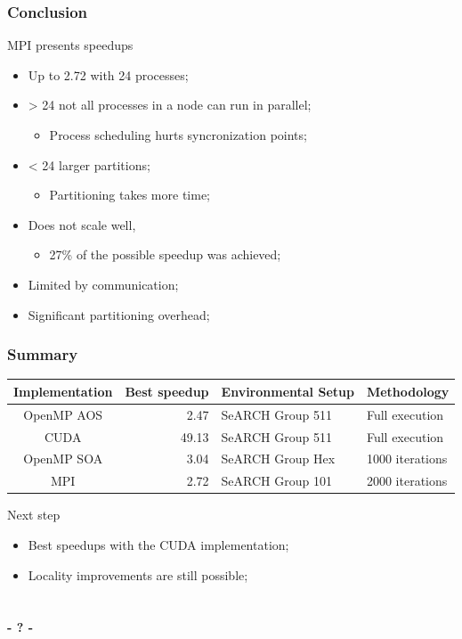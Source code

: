 \documentclass{beamer}
\begin{document}
\begin{frame}
	\frametitle{Conclusion}
	\begin{block}{MPI presents speedups}
		\begin{itemize}
			\item{Up to 2.72 with 24 processes;}
			\item{> 24 not all processes in a node can run in parallel;
			\begin{itemize}
				\item{Process scheduling hurts syncronization points;}
			\end{itemize}
			}
			\item{< 24 larger partitions;
			\begin{itemize}
				\item{Partitioning takes more time;}
			\end{itemize}
			}
			\item{Does not scale well,
			\begin{itemize}
				\item{27\% of the possible speedup was achieved;}
			\end{itemize}
			}
			\item{Limited by communication;}
			\item{Significant partitioning overhead;}
		\end{itemize}
	\end{block}
\end{frame}

\begin{frame}
	\frametitle{Summary}
	\begin{table}
		\smaller
		\begin{center}
			\begin{tabular}{c r ll}
			\hline
			\textbf{Implementation} & \textbf{Best speedup} & \textbf{Environmental Setup} & \textbf{Methodology}	\\
			\hline
			OpenMP AOS & 2.47 & SeARCH Group 511 & Full execution	\\
			CUDA & 49.13 & SeARCH Group 511 & Full execution	\\
			OpenMP SOA & 3.04 & SeARCH Group Hex & 1000 iterations	\\
			MPI & 2.72 & SeARCH Group 101 & 2000 iterations	\\
			\hline
			\end{tabular}
		\end{center}
	\end{table}
	\begin{block}{Next step}
		\begin{itemize}
			\item{Best speedups with the CUDA implementation;}
			\item{Locality improvements are still possible;}
		\end{itemize}
	\end{block}
\end{frame}

\section{} %

\begin{frame}[plain]
	\titlepage
	\begin{center}
		\Huge\bfseries - ? -
	\end{center}
\end{frame}
\end{document}

